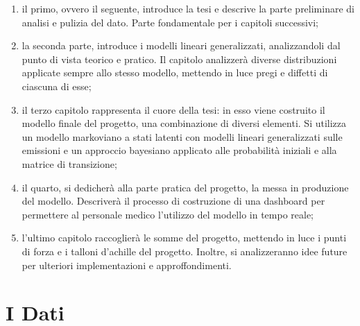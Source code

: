 \documentclass[
  italian,
  a4paper,
  a4paper,
  twoside,
  open=right,
  12pt]{scrbook}
\theoremstyle{definition}
\theoremstyle{remark}
\begin{document}
\begin{enumerate}
\def\labelenumi{\arabic{enumi}.}
\item
  il primo, ovvero il seguente, introduce la tesi e descrive la parte
  preliminare di analisi e pulizia del dato. Parte fondamentale per i
  capitoli successivi;
\item
  la seconda parte, introduce i modelli lineari generalizzati,
  analizzandoli dal punto di vista teorico e pratico. Il capitolo
  analizzerà diverse distribuzioni applicate sempre allo stesso modello,
  mettendo in luce pregi e diffetti di ciascuna di esse;
\item
  il terzo capitolo rappresenta il cuore della tesi: in esso viene
  costruito il modello finale del progetto, una combinazione di diversi
  elementi. Si utilizza un modello markoviano a stati latenti con
  modelli lineari generalizzati sulle emissioni e un approccio bayesiano
  applicato alle probabilità iniziali e alla matrice di transizione;
\item
  il quarto, si dedicherà alla parte pratica del progetto, la messa in
  produzione del modello. Descriverà il processo di costruzione di una
  dashboard per permettere al personale medico l'utilizzo del modello in
  tempo reale;
\item
  l'ultimo capitolo raccoglierà le somme del progetto, mettendo in luce
  i punti di forza e i talloni d'achille del progetto. Inoltre, si
  analizzeranno idee future per ulteriori implementazioni e
  approffondimenti.
\end{enumerate}

\section{I Dati}\label{sec-dati}
\end{document}
